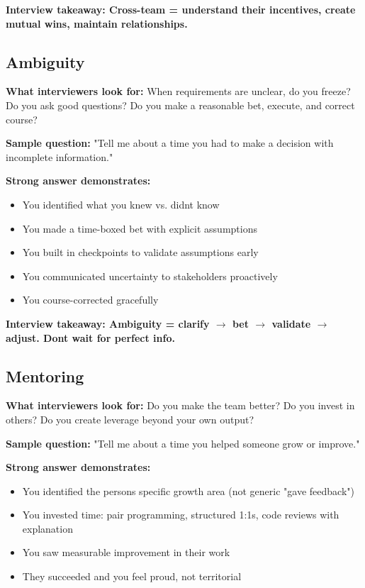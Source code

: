 \documentclass[11pt]{article}
\providecommand{\tightlist}{\setlength{\itemsep}{1pt}\setlength{\parskip}{0pt}}
\begin{document}
\textbf{Interview takeaway: Cross-team = understand their incentives, create mutual wins, maintain relationships.}

\subsection{Ambiguity}\label{ambiguity}

\textbf{What interviewers look for:} When requirements are unclear, do you freeze? Do you ask good questions? Do you make a reasonable bet, execute, and correct course?

\textbf{Sample question:} "Tell me about a time you had to make a decision with incomplete information."

\textbf{Strong answer demonstrates:}

\begin{itemize}
\tightlist
\item
  You identified what you knew vs. didn\textquotesingle t know
\item
  You made a time-boxed bet with explicit assumptions
\item
  You built in checkpoints to validate assumptions early
\item
  You communicated uncertainty to stakeholders proactively
\item
  You course-corrected gracefully
\end{itemize}

\textbf{Interview takeaway: Ambiguity = clarify \(\rightarrow\) bet \(\rightarrow\) validate \(\rightarrow\) adjust. Don\textquotesingle t wait for perfect info.}

\subsection{Mentoring}\label{mentoring}

\textbf{What interviewers look for:} Do you make the team better? Do you invest in others? Do you create leverage beyond your own output?

\textbf{Sample question:} "Tell me about a time you helped someone grow or improve."

\textbf{Strong answer demonstrates:}

\begin{itemize}
\tightlist
\item
  You identified the person\textquotesingle s specific growth area (not generic "gave feedback")
\item
  You invested time: pair programming, structured 1:1s, code reviews with explanation
\item
  You saw measurable improvement in their work
\item
  They succeeded and you feel proud, not territorial
\end{itemize}
\end{document}
